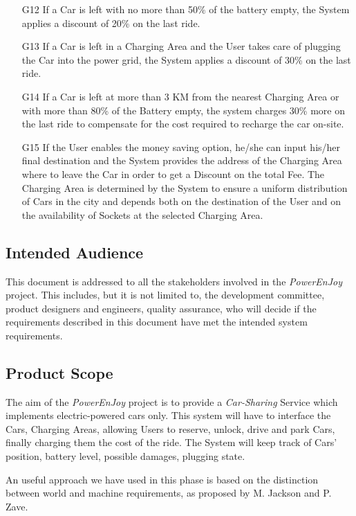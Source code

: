 \begin{enumerate}
	\item[G12] If a Car is left with no more than 50\% of the battery empty, the System applies a discount of 20\% on the last ride. 
	\item[G13] If a Car is left in a Charging Area and the User takes care of plugging the Car into the power grid, the System applies a discount of 30\% on the last ride. 
	\item[G14] If a Car is left at more than 3 KM from the nearest Charging Area or with more than 80\% of the Battery empty, the system charges 30\% more on the last ride to compensate for the cost required to recharge the car on-site.
	\item[G15] If the User enables the money saving option, he/she can input his/her final destination and the System provides the address of the Charging Area where to leave the Car in order to get a Discount on the total Fee. The Charging Area is determined by the System to ensure a uniform distribution of Cars in the city and depends both on the destination of the User and on the availability of Sockets at the selected Charging Area.
\end{enumerate}

\subsection{Intended Audience}
This document is addressed to all the stakeholders involved in the \emph{PowerEnJoy} project. This includes, but it is not limited to, the development committee, product designers and engineers, quality assurance, who will decide if the requirements described in this document have met the intended system requirements.

\subsection{Product Scope}
The aim of the \emph{PowerEnJoy} project is to provide a \textit{Car-Sharing} Service which implements electric-powered cars only.
This system will have to interface the Cars, Charging Areas, allowing Users to reserve, unlock, drive and park Cars, finally charging them the cost of the ride. 
The System will keep track of Cars' position, battery level, possible damages, plugging state.

An useful approach we have used in this phase is based on the distinction between world and machine requirements, as proposed by M. Jackson and P. Zave.

